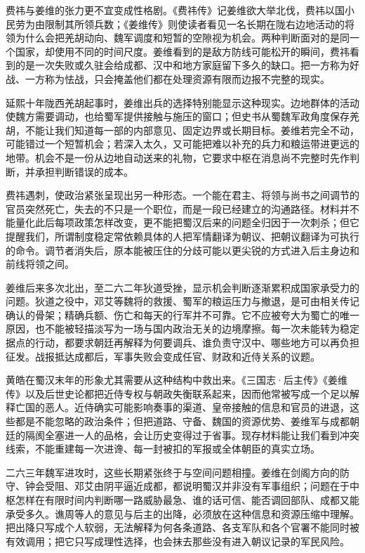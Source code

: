 费祎与姜维的张力更不宜变成性格剧。《费祎传》记姜维欲大举北伐，费祎以国小民劳为由限制其所领兵数；《姜维传》则使读者看见一名长期在陇右边地活动的将领为什么会把羌胡动向、魏军调度和短暂的空隙视为机会。两种判断面对的是同一个国家，却使用不同的时间尺度。姜维看到的是敌方防线可能松开的瞬间，费祎看到的是一次失败或久驻会给成都、汉中和地方家庭留下多久的缺口。把一方称为好战、一方称为怯战，只会掩盖他们都在处理资源有限而边报不完整的现实。

延熙十年陇西羌胡起事时，姜维出兵的选择特别能显示这种现实。边地群体的活动使魏方需要调动，也给蜀军提供接触与施压的窗口；但史书从蜀魏军政角度保存羌胡，不能让我们知道每一部的内部意见、固定边界或长期目标。姜维若完全不动，可能错过一个短暂机会；若深入太久，又可能把难以补充的兵力和粮运带进更远的地带。机会不是一份从边地自动送来的礼物，它要求中枢在消息尚不完整时先作判断，并承担判断错误的成本。

费祎遇刺，使政治紧张呈现出另一种形态。一个能在君主、将领与尚书之间调节的官员突然死亡，失去的不只是一个职位，而是一段已经建立的沟通路径。材料并不能量化此后每项政策怎样改变，更不能把蜀汉后来的问题全归因于一次刺杀；但它提醒我们，所谓制度稳定常依赖具体的人把军情翻译为朝议、把朝议翻译为可执行的命令。调节者消失后，原本能被压住的分歧可能以更尖锐的方式进入后主身边和前线将领之间。

姜维后来多次北出，至二六二年狄道受挫，显示机会判断逐渐累积成国家承受力的问题。狄道之役中，邓艾等魏将的救援、蜀军的粮运压力与撤退，是可由相关传记确认的骨架；精确兵额、伤亡和每天的行军并不可靠。它不应被夸大为蜀亡的唯一原因，也不能被轻描淡写为一场与国内政治无关的边境摩擦。每一次未能转为稳定据点的行动，都要求朝廷再解释为何要调兵、谁负责守汉中、哪些地方可以再负担征发。战报抵达成都后，军事失败会变成任官、财政和近侍关系的议题。

黄皓在蜀汉末年的形象尤其需要从这种结构中救出来。《三国志·后主传》《姜维传》以及后世史论都把近侍专权与朝政失衡联系起来，因而他常被写成一个足以解释亡国的恶人。近侍确实可能影响奏事的渠道、皇帝接触的信息和官员的进退，这些都是不能忽略的政治条件；但把道路、守备、魏国的资源优势、姜维军与成都朝廷的隔阂全塞进一人的品格，会让历史变得过于省事。现存材料能让我们看到冲突线索，不能重建每一次进谗、每一封被扣的军报或全体朝臣的真实立场。

二六三年魏军进攻时，这些长期紧张终于与空间问题相撞。姜维在剑阁方向的防守、钟会受阻、邓艾由阴平逼近成都，都说明蜀汉并非没有军事组织；问题在于中枢怎样在有限时间内判断哪一路威胁最急、谁的话可信、能否调回部队、成都又能承受多久。谯周等人的意见与后主的出降，必须放在这种信息和资源压缩中理解。把出降只写成个人软弱，无法解释为何各条道路、各支军队和各个官署不能同时被有效调用；把它只写成理性选择，也会抹去那些没有进入朝议记录的军民风险。

